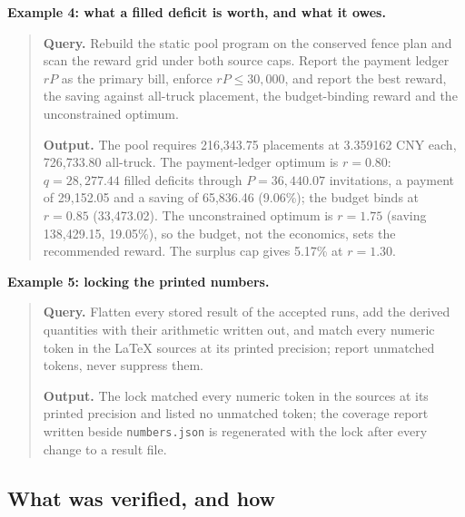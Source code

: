 \noindent\textbf{Example 4: what a filled deficit is worth, and what it owes.}
\begin{quote}
\small
\textbf{Query.} Rebuild the static pool program on the conserved fence plan and scan
the reward grid under both source caps. Report the payment ledger $rP$ as the primary
bill, enforce $rP\le30{,}000$, and report the best reward, the saving against all-truck
placement, the budget-binding reward and the unconstrained optimum.

\textbf{Output.} The pool requires 216{,}343.75 placements at 3.359162 CNY each,
726{,}733.80 all-truck. The payment-ledger optimum is $r=0.80$: $q=28{,}277.44$
filled deficits through $P=36{,}440.07$ invitations, a payment of 29{,}152.05 and a
saving of 65{,}836.46 (9.06\%); the budget binds at $r=0.85$ (33{,}473.02).
The unconstrained optimum is $r=1.75$ (saving 138{,}429.15, 19.05\%), so the budget,
not the economics, sets the recommended reward. The surplus cap gives 5.17\% at
$r=1.30$.
\end{quote}

\noindent\textbf{Example 5: locking the printed numbers.}
\begin{quote}
\small
\textbf{Query.} Flatten every stored result of the accepted runs, add the derived
quantities with their arithmetic written out, and match every numeric token in the
\LaTeX{} sources at its printed precision; report unmatched tokens, never suppress
them.

\textbf{Output.} The lock matched every numeric token in the sources at its printed
precision and listed no unmatched token; the coverage report written beside
\texttt{numbers.json} is regenerated with the lock after
every change to a result file.
\end{quote}

\subsection*{What was verified, and how}

